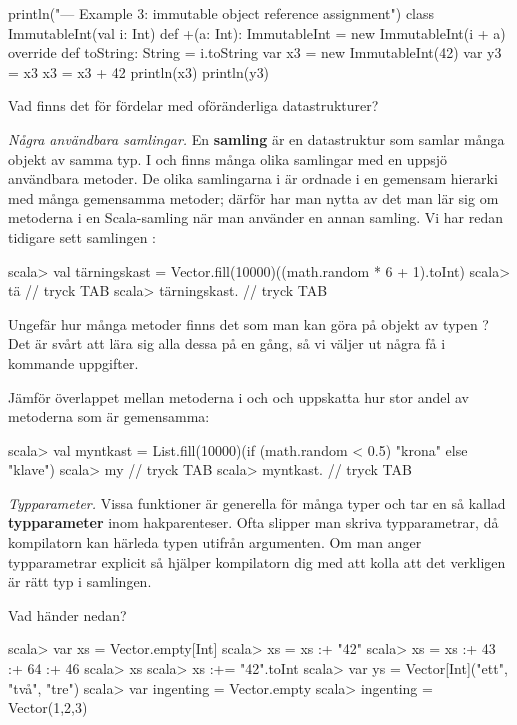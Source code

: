 \begin{Code}
println("\n--- Example 3: immutable object reference assignment")
class ImmutableInt(val i: Int) {
  def +(a: Int): ImmutableInt = new ImmutableInt(i + a) 
  override def toString: String = i.toString
}
var x3 = new ImmutableInt(42)
var y3 = x3
x3 = x3 + 42
println(x3)
println(y3)
\end{Code}

\Subtask\Pen Vad finns det för fördelar med oföränderliga datastrukturer?


\Task \emph{Några användbara samlingar.} En \textbf{samling}  är en datastruktur som samlar många objekt av samma typ. I  och  finns många olika samlingar med en uppsjö användbara metoder. De olika samlingarna i  är ordnade i en gemensam hierarki med många gemensamma metoder; därför har man nytta av det man lär sig om metoderna i en Scala-samling när man använder en annan samling. Vi har redan tidigare sett samlingen :

\begin{REPL}
scala> val tärningskast = Vector.fill(10000)((math.random * 6 + 1).toInt)
scala> tä   // tryck TAB
scala> tärningskast.  // tryck TAB
\end{REPL}

\Subtask Ungefär hur många metoder finns det som man kan göra på objekt av typen ? Det är svårt att lära sig alla dessa på en gång, så vi väljer ut några få i kommande uppgifter.

\Subtask Jämför överlappet mellan metoderna i  och  och uppskatta hur stor andel av metoderna som är gemensamma: 
\begin{REPL}
scala> val myntkast = 
         List.fill(10000)(if (math.random < 0.5) "krona" else "klave")
scala> my   // tryck TAB
scala> myntkast.  // tryck TAB
\end{REPL}

\Task \emph{Typparameter.} Vissa funktioner är generella för många typer och tar en så kallad \textbf{typparameter} inom hakparenteser. Ofta slipper man skriva typparametrar, då kompilatorn kan härleda typen utifrån argumenten. Om man anger typparametrar explicit så hjälper kompilatorn dig med att kolla att det verkligen är rätt typ i samlingen. 

\Subtask Vad händer nedan?
\begin{REPL}
scala> var xs = Vector.empty[Int]
scala> xs = xs :+ "42" 
scala> xs = xs :+ 43 :+ 64 :+ 46
scala> xs
scala> xs :+= "42".toInt 
scala> var ys = Vector[Int]("ett", "två", "tre")
scala> var ingenting = Vector.empty 
scala> ingenting = Vector(1,2,3)
\end{REPL}

